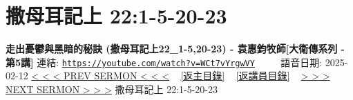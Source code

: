 \documentclass{book}
\begin{document}
\section{撒母耳記上 22:1-5-20-23}
\label{sec:WCt7vYrgwVY}
\textbf{走出憂鬱與黑暗的秘訣 (撒母耳記上22\_1-5,20-23) - 袁惠鈞牧師[大衛傳系列 - 第5講]}
\newline
\newline
連結: \href{https://youtube.com/watch?v=WCt7vYrgwVY}{\texttt{https://youtube.com/watch?v=WCt7vYrgwVY}} ~~~~ 語音日期: 2025-02-12
\newline
\newline
\hyperref[sec:rN0dS2BBBmc]{< < < PREV SERMON < < <}
~
\hyperlink{toc}{[返主目錄]}
~
\hyperref[ch:preacher11]{[返講員目錄]}
~
\hyperref[sec:GqTOPwqfjwM]{> > > NEXT SERMON > > >}
\newline
\newline
撒母耳記上 22:1-5-20-23
\newline
\end{document}
